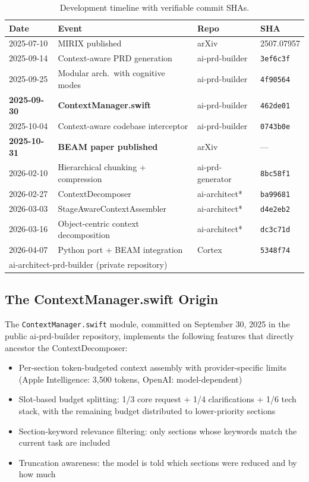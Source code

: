 \documentclass[11pt]{article}
\begin{document}
\begin{table}[t]
\centering
\caption{Development timeline with verifiable commit SHAs.}
\label{tab:timeline}
\small
\begin{tabular}{llll}
\toprule
Date & Event & Repo & SHA \\
\midrule
2025-07-10 & MIRIX published & arXiv & 2507.07957 \\
2025-09-14 & Context-aware PRD generation & ai-prd-builder & \texttt{3ef6c3f} \\
2025-09-25 & Modular arch.\ with cognitive modes & ai-prd-builder & \texttt{4f90564} \\
\textbf{2025-09-30} & \textbf{ContextManager.swift} & ai-prd-builder & \texttt{462de01} \\
2025-10-04 & Context-aware codebase interceptor & ai-prd-builder & \texttt{0743b0e} \\
\textbf{2025-10-31} & \textbf{BEAM paper published} & arXiv & --- \\
2026-02-10 & Hierarchical chunking + compression & ai-prd-generator & \texttt{8bc58f1} \\
2026-02-27 & ContextDecomposer & ai-architect* & \texttt{ba99681} \\
2026-03-03 & StageAwareContextAssembler & ai-architect* & \texttt{d4e2eb2} \\
2026-03-16 & Object-centric context decomposition & ai-architect* & \texttt{dc3c71d} \\
2026-04-07 & Python port + BEAM integration & Cortex & \texttt{5348f74} \\
\bottomrule
\multicolumn{4}{l}{\footnotesize *ai-architect-prd-builder (private repository)} \\
\end{tabular}
\end{table}

\subsection{The ContextManager.swift Origin}

The \texttt{ContextManager.swift} module, committed on September 30,
2025 in the public ai-prd-builder repository, implements the following
features that directly ancestor the ContextDecomposer:

\begin{itemize}
  \item Per-section token-budgeted context assembly with
    provider-specific limits (Apple Intelligence: 3,500 tokens,
    OpenAI: model-dependent)
  \item Slot-based budget splitting: 1/3 core request + 1/4
    clarifications + 1/6 tech stack, with the remaining budget
    distributed to lower-priority sections
  \item Section-keyword relevance filtering: only sections whose
    keywords match the current task are included
  \item Truncation awareness: the model is told which sections were
    reduced and by how much
\end{itemize}
\end{document}
